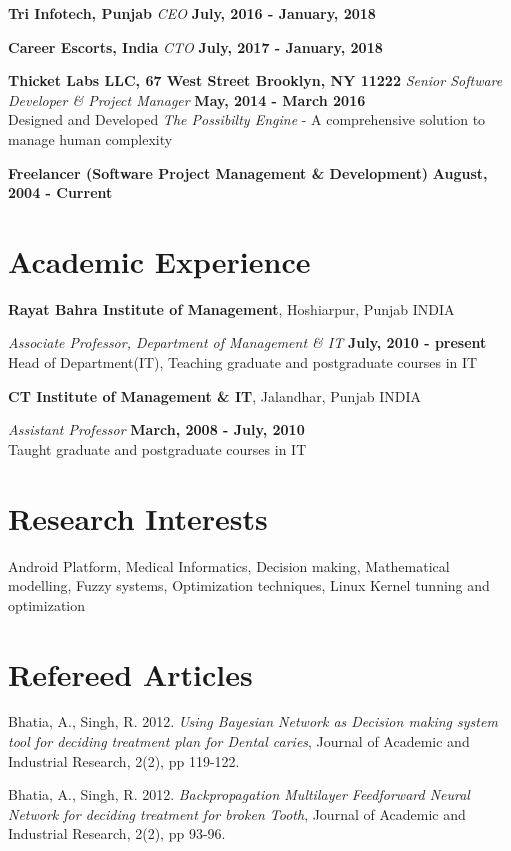 \documentclass[margin,line]{res}
\begin{document}
\begin{resume}
{\bf Tri Infotech, Punjab}
{\em CEO} \hfill {\bf July, 2016 - January, 2018}

{\bf Career Escorts, India}
{\em CTO} \hfill {\bf July, 2017 - January, 2018}

{\bf Thicket Labs LLC, 67 West Street Brooklyn, NY 11222}
{\em Senior Software Developer \& Project Manager} \hfill {\bf May, 2014 - March 2016}\\
Designed and Developed {\em The Possibilty Engine} - A comprehensive solution to manage human complexity

{\bf Freelancer (Software Project Management \& Development)} \hfill {\bf August, 2004 - Current}

\section{\sc Academic Experience}
{\bf Rayat Bahra Institute of Management}, Hoshiarpur, Punjab INDIA

\vspace{-.3cm}
{\em Associate Professor, Department of Management \& IT} \hfill {\bf July, 2010 - present}\\
Head of Department(IT), Teaching graduate and postgraduate courses in IT

{\bf CT Institute of Management \& IT}, Jalandhar, Punjab INDIA

\vspace{-.3cm}
{\em Assistant Professor} \hfill {\bf March, 2008 - July, 2010}\\
Taught graduate and postgraduate courses in IT

\section{\sc Research Interests}
Android Platform, Medical Informatics, Decision making, Mathematical modelling, Fuzzy systems, Optimization techniques, Linux Kernel tunning and optimization

\section{\sc Refereed Articles}

Bhatia, A., Singh, R. 2012. \emph{Using Bayesian Network as Decision making system tool for deciding treatment plan for Dental caries}, Journal of Academic and Industrial Research, 2(2), pp 119-122.

Bhatia, A., Singh, R. 2012. \emph{Backpropagation Multilayer Feedforward Neural Network for deciding treatment for broken Tooth}, Journal of Academic and Industrial Research, 2(2), pp 93-96.


\end{resume}
\end{document}
